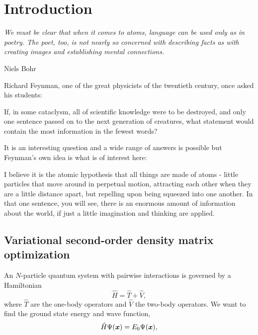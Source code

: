\chapter{Introduction}\label{ch1}
\setlength{\epigraphrule}{0pt}
\setlength{\epigraphwidth}{0.75\textwidth}
\epigraph{\textit{We must be clear that when it comes to atoms, language can be used only as in poetry. The poet, too, is not nearly so concerned with describing facts as with creating images and establishing mental connections.}}{Niels Bohr}

Richard Feynman, one of the great physicists of the twentieth century, once asked his students:
\begin{displayquote}
If, in some cataclysm, all of scientific knowledge were to be destroyed, and only one sentence passed on to the next generation of creatures, what statement would contain the most information in the fewest words?
\end{displayquote}
It is an interesting question and a wide range of answers is possible but Feynman's own idea is what is of interest here:
\begin{displayquote}
I believe it is the atomic hypothesis that all things are made of atoms - little particles that move around in perpetual motion, attracting each other when they are a little distance apart, but repelling upon being squeezed into one another. In that one sentence, you will see, there is an enormous amount of information about the world, if just a little imagination and thinking are applied.
\end{displayquote}



\section{Variational second-order density matrix optimization}\label{ch1-sec2}

An $N$-particle quantum system with pairwise interactions is governed by a Hamiltonian
\begin{equation}
    \hat H = \hat T + \hat V,
    \label{1-eq15}
\end{equation}
where $\hat T$ are the one-body operators and $\hat V$ the two-body operators. We want to find the ground state energy and wave function,
\begin{equation}
    \hat H \Psi(\boldsymbol{x}) = E_0 \Psi(\boldsymbol{x}),
    \label{1-eq16}
\end{equation}

